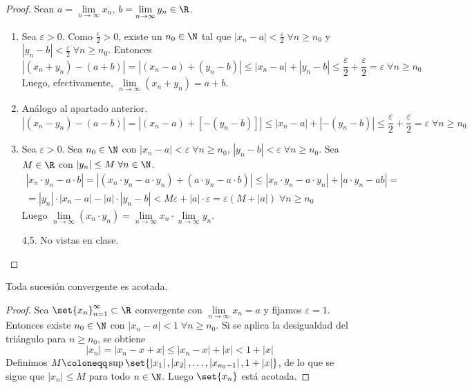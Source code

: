 \begin{proof}
	Sean \(a = \lim\limits_{n \to \infty} x_n \), \(b = \lim\limits_{n \to \infty} y_n \in \R\).
	\begin{enumerate}
		\item Sea \(\varepsilon > 0 \). Como \(\frac{\epsilon}{2} > 0\),   existe un \(n_0 \in \N 	\) tal que \(|x_n - a| < \frac{\varepsilon}{2} \; \forall n \geq n_0\) y  \(|y_n - b| < \frac{\varepsilon}{2} \; \forall n \geq n_0 \). Entonces
		      \[
			      |(x_n + y_n) - (a + b) | = |(x_n - a) + (y_n - b)| \leq |x_n - a| + |y_n - b| \leq \frac{\varepsilon}{2} + \frac{\varepsilon}{2} = \varepsilon \; \forall n \geq n_0
		      \]
		      Luego, efectivamente, \(\lim\limits_{n \to \infty} (x_n + y_n) = a + b \).
		\item Análogo al apartado anterior.
		      \[
			      |(x_n - y_n) - (a - b) | = |(x_n - a) +  [-(y_n - b)]| \leq |x_n - a| + |-(y_n - b)| \leq \frac{\varepsilon}{2} + \frac{\varepsilon}{2} = \varepsilon \; \forall n \geq n_0
		      \]
		\item Sea \(\varepsilon > 0 \). Sea \(n_0 \in \N \) con \(|x_n - a| < \varepsilon \; \forall n \geq n_0 \), \(|y_n - b| < \varepsilon \; \forall n \geq n_0 \). Sea \(M \in \R \) con \(|y_n| \leq M \; \forall n \in \N\).
		      \begin{multline*}
			      |x_n \cdot y_n - a \cdot b| = |(x_n \cdot y_n - a \cdot y_n) + (a \cdot y_n - a \cdot b)| \leq |x_n \cdot y_n - a \cdot y_n | + |a \cdot y_n - ab| = \\ = |y_n| \cdot |x_n - a| - |a| \cdot |y_n - b| < M \varepsilon + |a| \cdot \varepsilon = \varepsilon(M + |a|) \; \forall n \geq n_0
		      \end{multline*}
		      Luego \(\lim\limits_{n \to \infty} (x_n \cdot y_n) = \lim\limits_{n \to \infty} x_n \cdot \lim\limits_{n \to \infty} y_n \).
		\item[4,5.] No vistas en clase.
	\end{enumerate}
\end{proof}
\begin{proposition}
	Toda sucesión convergente es acotada.
\end{proposition}
\begin{proof}
	Sea \(\set{x_n}^{\infty}_{n = 1 } \subset \R\) convergente con \(\lim\limits_{n \to \infty} x_n = a \) y fijamos \(\varepsilon = 1 \). Entonces existe \(n_0 \in \N \) con \(|x_n - a| < 1 \; \forall n \geq n_0 \). Si se aplica la desigualdad del triángulo para \(n \geq n_0 \), se obtiene
	\[
		\left\vert x_n  \right\vert = \left\vert x_n - x + x  \right\vert \leq \left\vert x_n - x  \right\vert + \left\vert x  \right\vert < 1 + \left\vert x  \right\vert
	\]
	Definimos
	\(
	M \coloneqq \sup \set{\left\vert x_1  \right\vert, \left\vert x_2  \right\vert, \ldots, \left\vert x_{n_0 - 1} \right\vert, 1 + \left\vert x  \right\vert}
	\), de lo que se sigue que \(\left\vert x_n  \right\vert \leq M \) para todo \(n \in \N \). Luego \(\set{x_n}\) está acotada.
\end{proof}
